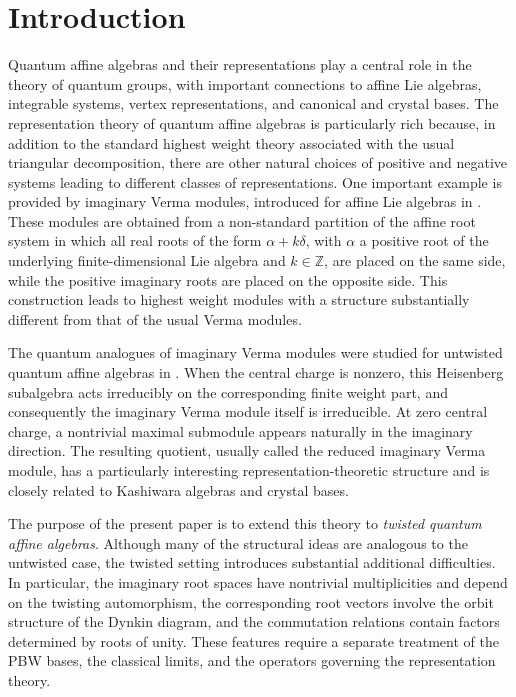 \documentclass[12pt]{amsart}
\numberwithin{equation}{section}
\begin{document}
\section{Introduction}

Quantum affine algebras and their representations play a central role in the theory of quantum groups, with important connections to affine Lie algebras, integrable systems, vertex representations, and canonical and crystal bases. The representation theory of quantum affine algebras is particularly rich because, in addition to the standard highest weight theory associated with the usual triangular decomposition, there are other natural choices of positive and negative systems leading to different classes of representations. One important example is provided by imaginary Verma modules, introduced for affine Lie algebras in \cite{Fut}. These modules are obtained from a non-standard partition of the affine root system in which all real roots of the form $\alpha+k\delta$, with $\alpha$ a positive root of the underlying finite-dimensional Lie algebra and $k\in\mathbb Z$, are placed on the same side, while the positive imaginary roots are placed on the opposite side. This construction leads to highest weight modules with a structure substantially different from that of the usual Verma modules.

The quantum analogues of imaginary Verma modules were studied for untwisted quantum affine algebras in \cite{CFM01,AFM}.  When the central charge is nonzero, this Heisenberg subalgebra acts irreducibly on the corresponding finite weight part, and consequently the imaginary Verma module itself is irreducible. At zero central charge, a nontrivial maximal submodule appears naturally in the imaginary direction. The resulting quotient, usually called the reduced imaginary Verma module, has a particularly interesting representation-theoretic structure and is closely related to Kashiwara algebras and crystal bases.

The purpose of the present paper is to extend this theory to \emph{twisted quantum affine algebras}. Although many of the structural ideas are analogous to the untwisted case, the twisted setting introduces substantial additional difficulties. In particular, the imaginary root spaces have nontrivial multiplicities and depend on the twisting automorphism, the corresponding root vectors involve the orbit structure of the Dynkin diagram, and the commutation relations contain factors determined by roots of unity. These features require a separate treatment of the PBW bases, the classical limits, and the operators governing the representation theory.
\end{document}
